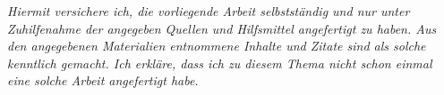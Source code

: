 \documentclass{article}
\begin{document}
        \tableofcontents
        \newpage
    
    
        \textit{Hiermit versichere ich, die vorliegende Arbeit selbstständig und nur unter Zuhilfenahme der angegeben Quellen und Hilfsmittel angefertigt zu haben. Aus den angegebenen Materialien entnommene Inhalte und Zitate sind als solche kenntlich gemacht. Ich erkläre, dass ich zu diesem Thema nicht schon einmal eine solche Arbeit angefertigt habe.}

    
        
        
        
        \newpage
    
        
        \label{sec:glossary}
        \printglossary
        \label{sec:symb}
        \printnomenclature
        \newpage
        
        \printbibliography[heading=bibintoc]
\end{document}
